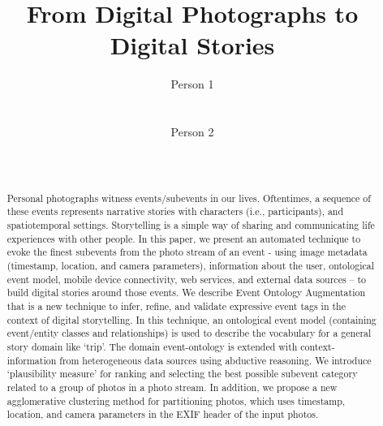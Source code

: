 \documentclass{sig-alternate}
\begin{document}
\title{From Digital Photographs to Digital Stories}

\author{
\alignauthor
Person 1\\
       \\
       \\
\alignauthor
Person 2\\
       \\
       \\
}


\maketitle
\begin{abstract}
Personal photographs witness events/subevents in our lives. Oftentimes, a sequence of these events represents narrative stories with characters (i.e., participants), and spatiotemporal settings. Storytelling is a simple way of sharing and communicating life experiences with other people. In this paper, we present an automated technique to evoke the finest subevents from the photo stream of an event - using image metadata (timestamp, location, and camera parameters), information about the user, ontological event model, mobile device connectivity, web services, and external data sources – to build digital stories around those events. We describe Event Ontology Augmentation that is a new technique to infer, refine, and validate expressive event tags in the context of digital storytelling. In this technique, an ontological event model (containing event/entity classes and relationships) is used to describe the vocabulary for a general story domain like ‘trip’. The domain event-ontology is extended with context-information from heterogeneous data sources using abductive reasoning. We introduce ‘plausibility measure’ for ranking and selecting the best possible subevent category related to a group of photos in a photo stream. In addition, we propose a new agglomerative clustering method for partitioning photos, which uses timestamp, location, and camera parameters in the EXIF header of the input photos.  
\end{abstract}


\end{document}
